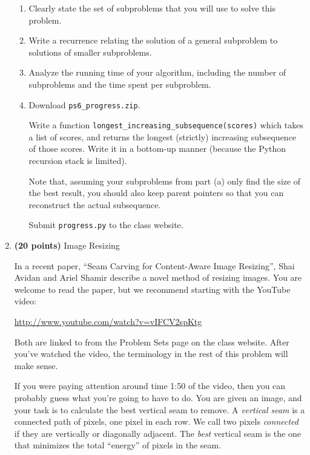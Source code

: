 \documentclass[12pt,twoside]{article}
\begin{document}
\begin{enumerate}
  \begin{enumerate}
  \item Clearly state the set of subproblems that you will use to
    solve this problem.
  \item Write a recurrence relating the solution of a general
    subproblem to solutions of smaller subproblems.
  \item Analyze the running time of your algorithm, including the
    number of subproblems and the time spent per subproblem.
  \item Download \verb|ps6_progress.zip|.

    Write a function \verb|longest_increasing_subsequence(scores)|
    which takes a list of scores, and returns the longest (strictly)
    increasing subsequence of those scores. Write it in a bottom-up
    manner (because the Python recursion stack is limited).

    Note that, assuming your subproblems from part (a) only find the
    size of the best result, you should also keep parent pointers so
    that you can reconstruct the actual subsequence.

    Submit \verb|progress.py| to the class website.

  \end{enumerate}

\item {\bf (20 points)} Image Resizing

  In a recent paper, ``Seam Carving for Content-Aware Image
  Resizing'', Shai Avidan and Ariel Shamir describe a novel method of
  resizing images. You are welcome to read the paper, but we recommend
  starting with the YouTube video:

  \centerline{\url{http://www.youtube.com/watch?v=vIFCV2spKtg}}

  \noindent
  Both are linked to
  from the Problem Sets page on the class website. After you've
  watched the video, the terminology in the rest of this problem will
  make sense.

  If you were paying attention around time 1:50 of the video, then you
  can probably guess what you're going to have to do. You are given an
  image, and your task is to calculate the best vertical seam to
  remove. A \emph{vertical seam} is a connected path of pixels, one
  pixel in each row. We call two pixels \emph{connected} if they are
  vertically or diagonally adjacent. The \emph{best} vertical seam is
  the one that minimizes the total ``energy'' of pixels in the seam.


\end{enumerate}
\end{document}

